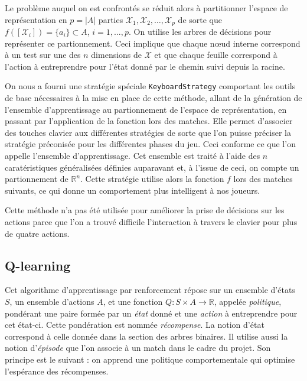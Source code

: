 \documentclass[12pt,a4paper]{article}
\begin{document}
Le probl\`eme auquel on est confront\'es se r\'eduit alors \`a 
partitionner l'espace de repr\'esentation en $p=|A|$ parties 
$\mathcal{X}_1,\mathcal{X}_2,\dotsc,\mathcal{X}_p$ de sorte que 
$f([\mathcal{X}_i]) = \{ a_i \} \subset A$, $i = 1,\dotsc,p$. On utilise les 
arbres de d\'ecisions pour repr\'esenter ce partionnement. Ceci 
implique que chaque n\oe ud interne correspond \`a un test sur une des $n$ 
dimensions de $\mathcal{X}$ et que chaque feuille correspond \`a l'action \`a 
entreprendre pour l'\'etat donn\'e par le chemin suivi depuis la racine.

On nous a fourni une strat\'egie sp\'eciale \texttt{KeyboardStrategy} 
comportant les outils de base n\'ecessaires \`a la mise en place de cette 
m\'ethode, allant de la g\'en\'eration de l'ensemble d'apprentissage au 
partionnement de l'espace de repr\'esentation, en passant par l'application de 
la fonction lors des matches. 
Elle permet d'associer des touches clavier aux diff\'erentes strat\'egies de 
sorte que l'on puisse pr\'eciser la strat\'egie pr\'econis\'ee pour les 
diff\'erentes phases du jeu. Ceci conforme ce que l'on appelle l'ensemble 
d'apprentissage. Cet ensemble est trait\'e \`a l'aide des $n$ carat\'eristiques 
g\'en\'eralis\'ees d\'efinies auparavant et, \`a l'issue de ceci, on compte 
un partionnement de $\mathbb{R}^n$. Cette strat\'egie utilise alors la fonction 
$f$ lors des matches suivants, ce qui donne un comportement plus intelligent 
\`a nos joueurs.

Cette m\'ethode n'a pas \'et\'e utilis\'ee pour am\'eliorer la 
prise de d\'ecisions sur les actions parce que l'on a trouv\'e difficile 
l'interaction \`a travers le clavier pour plus de quatre actions.

\subsection*{Q-learning}
Cet algorithme d'apprentissage par renforcement r\'epose sur un ensemble 
d'\'etats $S$, un ensemble d'actions $A$, et une fonction $Q: S \times A \to 
\mathbb{R}$, appel\'ee {\itshape politique}, pond\'erant une paire form\'ee 
par un {\itshape \'etat} donn\'e et une {\itshape action} \`a entreprendre pour 
cet \'etat-ci. Cette pond\'eration est nomm\'ee {\itshape r\'ecompense}. La 
notion d'\'etat correspond \`a celle donn\'ee dans la section des arbres 
binaires. Il utilise aussi la notion d'{\itshape \'episode} que l'on associe 
\`a un match dans le cadre du projet. Son principe est le suivant : on apprend 
une politique comportementale qui optimise l'esp\'erance des r\'ecompenses.
\end{document}
